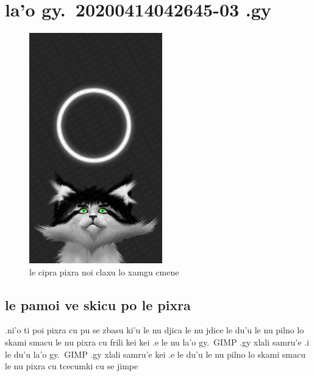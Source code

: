 \documentclass{report}
\newcommand\imageheight{10cm}
\begin{document}
\chapter{la'o gy.\ 20200414042645-03 .gy}
\begin{figure}[ht]
	\centering
	\includegraphics[height=\imageheight]{20200414042645-03/20200414042645-03.jpg}
	\caption[center]{le cipra pixra noi claxu lo xamgu cmene}
\end{figure}
\section{le pamoi ve skicu po le pixra}
.ni'o ti poi pixra cu pu se zbasu ki'u le nu djica le nu jdice le du'u le nu pilno lo skami smacu le nu pixra cu frili kei kei .e le nu la'o gy.\ GIMP .gy xlali samru'e \@ .i le du'u la'o gy.\ GIMP .gy xlali samru'e kei .e le du'u le nu pilno lo skami smacu le nu pixra cu tcecumki cu se jimpe
\end{document}
